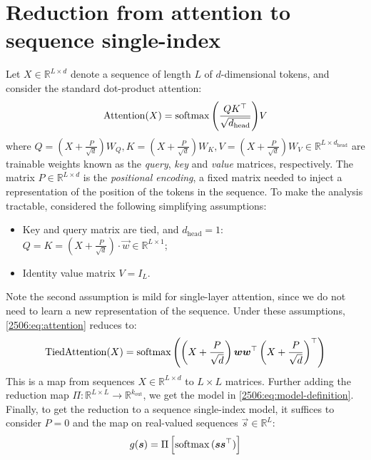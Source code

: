 \section{Reduction from attention to sequence single-index}
\label{2506:app:reduction}
Let \(X\in\mathbb{R}^{L\times d}\) denote a sequence of length \(L\) of \(d\)-dimensional tokens, and consider the standard dot-product attention:
\begin{equation}
\label{2506:eq:attention}
    \mathrm{Attention}(X) = \operatorname{softmax}{\left(\frac{QK^\top}{\sqrt{d_\mathrm{head}}}\right)}V
\end{equation}
where \(Q = \left(X+\frac{P}{\sqrt{d}}\right)W_Q, K = \left(X+\frac{P}{\sqrt{d}}\right)W_K, V = \left(X+\frac{P}{\sqrt{d}}\right)W_V \in \mathbb{R}^{L\times d_\mathrm{head}}\) are trainable weights known as the \emph{query}, \emph{key} and \emph{value} matrices, respectively. The matrix \(P\in\mathbb{R}^{L\times d}\) is the \emph{positional encoding}, a fixed matrix needed to inject a representation of the position of the tokens in the sequence. To make the analysis tractable, \citep{troiani2025fundamental} considered the following simplifying assumptions: 
\begin{itemize}
    \item Key and query matrix are tied, and \(d_\mathrm{head}= 1\): \(Q=K=\left(X+\frac{P}{\sqrt{d}}\right)\cdot \vec{w}\in \mathbb{R}^{L\times1}\);
    \item Identity value matrix \(V=I_{L}\). 
\end{itemize}
Note the second assumption is mild for single-layer attention, since we do not need to learn a new representation of the sequence. Under these assumptions, \cref{2506:eq:attention} reduces to:
\begin{equation}
    \mathrm{TiedAttention}(X) =  \operatorname{softmax}{\left(\left(X+\frac{P}{\sqrt{d}}\right){\boldsymbol{w}}{\boldsymbol{w}}^\top\left(X+\frac{P}{\sqrt{d}}\right)^\top\right)}
\end{equation}
This is a map from sequences $X\in\mathbb{R}^{L\times d}$ to $L\times L$ matrices. Further adding the reduction map $\Pi:\mathbb{R}^{L\times L}\to \mathbb{R}^{k_\mathrm{out}}$, we get the model in \cref{2506:eq:model-definition}. Finally, to get the reduction to a sequence single-index model, it suffices to consider $P=0$ and the map on real-valued sequences $\vec{s}\in\mathbb{R}^{L}$:
\begin{align}
    g({\boldsymbol{s}}) = \Pi\left[\operatorname{softmax}{({\boldsymbol{s}}{\boldsymbol{s}}^{\top})}\right]
\end{align}
